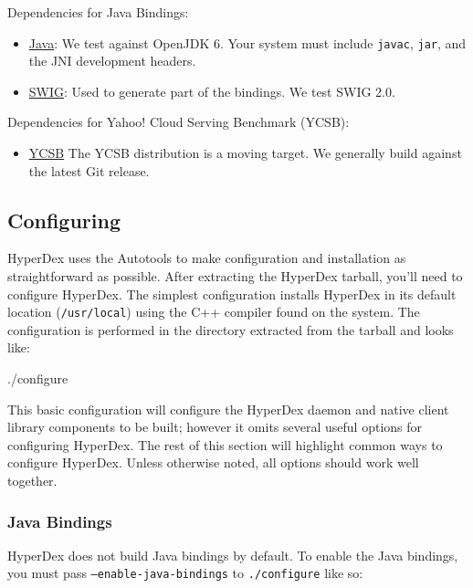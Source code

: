 Dependencies for Java Bindings:

\begin{itemize}
\item \href{http://openjdk.java.net/}{Java}: We test against OpenJDK 6.  Your
    system must include \texttt{javac}, \texttt{jar}, and the JNI development
    headers.
\item \href{http://www.swig.org/}{SWIG}: Used to generate part of the
    bindings.  We test SWIG 2.0.
\end{itemize}

Dependencies for Yahoo! Cloud Serving Benchmark (YCSB):

\begin{itemize}
\item \href{https://github.com/brianfrankcooper/YCSB/wiki}{YCSB} The YCSB
    distribution is a moving target.  We generally build against the latest Git
    release.
\end{itemize}

\subsection{Configuring}

HyperDex uses the Autotools to make configuration and installation as
straightforward as possible.  After extracting the HyperDex tarball, you'll need
to configure HyperDex.  The simplest configuration installs HyperDex in its
default location (\texttt{/usr/local}) using the C++ compiler found on the
system.  The configuration is performed in the directory extracted from the
tarball and looks like:

\begin{consolecode}
./configure
\end{consolecode}

This basic configuration will configure the HyperDex daemon and native client
library components to be built; however it omits several useful options for
configuring HyperDex.  The rest of this section will highlight common ways to
configure HyperDex.  Unless otherwise noted, all options should work well
together.

\subsubsection{Java Bindings}

HyperDex does not build Java bindings by default.  To enable the Java bindings,
you must pass \texttt{--enable-java-bindings} to \texttt{./configure} like so:


